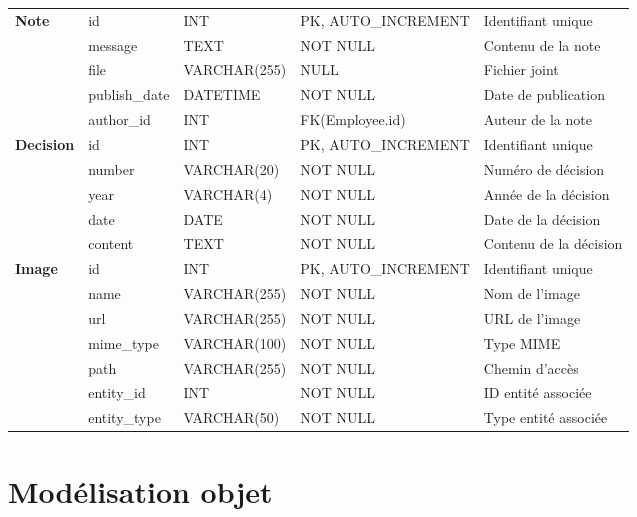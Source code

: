 \begin{longtable}{|p{2.5cm}|p{3cm}|p{3cm}|p{3cm}|p{3cm}|}
    \multirow{4}{*}{\textbf{Note}} & id & INT & PK, AUTO\_INCREMENT & Identifiant unique \\
    \cline{2-5}
    & message & TEXT & NOT NULL & Contenu de la note \\
    \cline{2-5}
    & file & VARCHAR(255) & NULL & Fichier joint \\
    \cline{2-5}
    & publish\_date & DATETIME & NOT NULL & Date de publication \\
    \cline{2-5}
    & author\_id & INT & FK(Employee.id) & Auteur de la note \\
    \hline

    \multirow{5}{*}{\textbf{Decision}} & id & INT & PK, AUTO\_INCREMENT & Identifiant unique \\
    \cline{2-5}
    & number & VARCHAR(20) & NOT NULL & Numéro de décision \\
    \cline{2-5}
    & year & VARCHAR(4) & NOT NULL & Année de la décision \\
    \cline{2-5}
    & date & DATE & NOT NULL & Date de la décision \\
    \cline{2-5}
    & content & TEXT & NOT NULL & Contenu de la décision \\
    \hline

    \multirow{6}{*}{\textbf{Image}} & id & INT & PK, AUTO\_INCREMENT & Identifiant unique \\
    \cline{2-5}
    & name & VARCHAR(255) & NOT NULL & Nom de l'image \\
    \cline{2-5}
    & url & VARCHAR(255) & NOT NULL & URL de l'image \\
    \cline{2-5}
    & mime\_type & VARCHAR(100) & NOT NULL & Type MIME \\
    \cline{2-5}
    & path & VARCHAR(255) & NOT NULL & Chemin d'accès \\
    \cline{2-5}
    & entity\_id & INT & NOT NULL & ID entité associée \\
    \cline{2-5}
    & entity\_type & VARCHAR(50) & NOT NULL & Type entité associée \\
    \hline
\end{longtable}
\begin{center}  
    \label{tab:table_dictionnaire_data_ameliore}  
\end{center}

\section{Modélisation objet}

